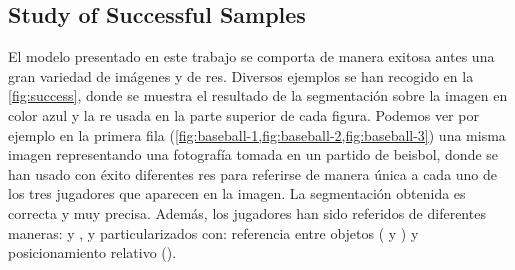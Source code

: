 \subsection{Study of Successful Samples}\label{sec:succesful}

El modelo presentado en este trabajo se comporta de manera exitosa antes una
gran variedad de imágenes y de \glspl{re}. Diversos ejemplos se han recogido en
la \vref{fig:success}, donde se muestra el resultado de la segmentación sobre
la imagen en color azul y la \gls{re} usada en la parte superior de cada
figura. Podemos ver por ejemplo en la primera fila
(\vref{fig:baseball-1,fig:baseball-2,fig:baseball-3}) una misma imagen
representando una fotografía tomada en un partido de beisbol, donde se han
usado con éxito diferentes \glspl{re} para referirse de manera única a cada uno
de los tres jugadores que aparecen en la imagen. La segmentación obtenida es
correcta y muy precisa. Además, los jugadores han sido referidos de diferentes
maneras:  y , y particularizados con: referencia entre
objetos ( y ) y posicionamiento relativo
().

